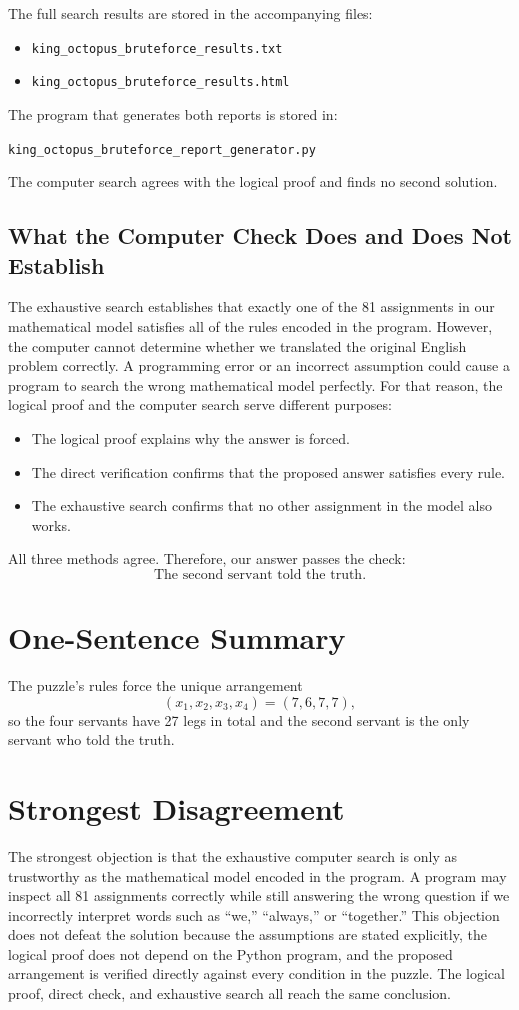 \documentclass[11pt]{article}
\begin{document}
The full search results are stored in the accompanying files: \begin{itemize} \item \texttt{king\_octopus\_bruteforce\_results.txt} \item \texttt{king\_octopus\_bruteforce\_results.html} \end{itemize} The program that generates both reports is stored in: \begin{center} \texttt{king\_octopus\_bruteforce\_report\_generator.py} \end{center} The computer search agrees with the logical proof and finds no second solution. \subsection*{What the Computer Check Does and Does Not Establish} The exhaustive search establishes that exactly one of the 81 assignments in our mathematical model satisfies all of the rules encoded in the program. However, the computer cannot determine whether we translated the original English problem correctly. A programming error or an incorrect assumption could cause a program to search the wrong mathematical model perfectly. For that reason, the logical proof and the computer search serve different purposes: \begin{itemize} \item The logical proof explains why the answer is forced. \item The direct verification confirms that the proposed answer satisfies every rule. \item The exhaustive search confirms that no other assignment in the model also works. \end{itemize} All three methods agree. Therefore, our answer passes the check: \[ \boxed{\text{The second servant told the truth.}} \]

\section*{One-Sentence Summary} The puzzle's rules force the unique arrangement \[ (x_1,x_2,x_3,x_4)=(7,6,7,7), \] so the four servants have 27 legs in total and the second servant is the only servant who told the truth.

\section*{Strongest Disagreement} The strongest objection is that the exhaustive computer search is only as trustworthy as the mathematical model encoded in the program. A program may inspect all 81 assignments correctly while still answering the wrong question if we incorrectly interpret words such as ``we,'' ``always,'' or ``together.'' This objection does not defeat the solution because the assumptions are stated explicitly, the logical proof does not depend on the Python program, and the proposed arrangement is verified directly against every condition in the puzzle. The logical proof, direct check, and exhaustive search all reach the same conclusion.
\end{document}
